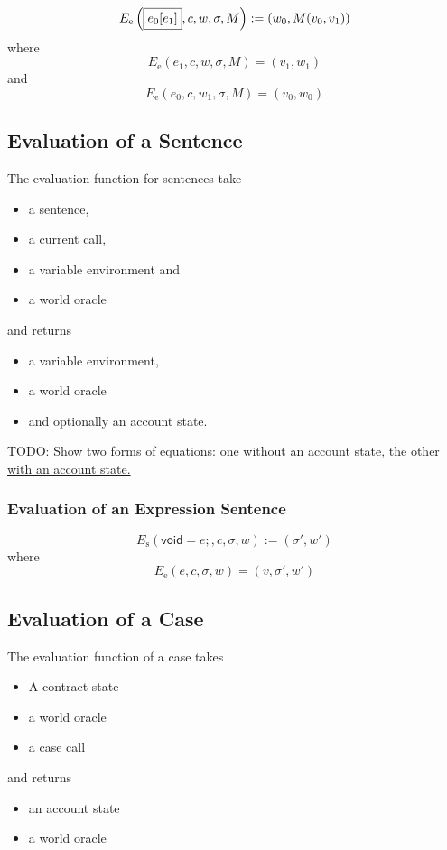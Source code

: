 \documentclass{book}
\newcommand{\todo}[1]{\underline{TODO: {#1}}}
\newcommand{\evalE}[1]{E_\mathrm{e}\left({#1}\right)}
\newcommand{\evalS}[1]{E_\mathrm{s}\left({#1}\right)}
\newcommand{\expressionsentence}[1]{\mathsf{void}={#1}\mathsf{;}}
\begin{document}
\[
\evalE{\boxed{\arrayAccess{e_0}{e_1}}, c, w, \sigma, M} :=
(w_0, M(v_0, v_1))
\]
where
\[
\evalE{\boxed{e_1}, c, w, \sigma, M} = (v_1, w_1)
\]
and
\[
\evalE{\boxed{e_0}, c, w_1, \sigma, M} = (v_0, w_0)
\]

\subsection{Evaluation of a Sentence}

The evaluation function for sentences take
\begin{itemize}
\item a sentence,
\item a current call,
\item a variable environment and
\item a world oracle
\end{itemize}
and returns
\begin{itemize}
\item a variable environment,
\item a world oracle
\item and optionally an account state.
\end{itemize}

\todo{Show two forms of equations: one without an account state, the other with an account state.}

\subsubsection{Evaluation of an Expression Sentence}

\[
\evalS{\boxed{\expressionsentence{e}}, c, \sigma, w} := (\sigma', w')
\]
where
\[
\evalE{\boxed{e}, c, \sigma, w} = (v, \sigma', w')
\]

\subsection{Evaluation of a Case}

The evaluation function of a case takes
\begin{itemize}
\item A contract state
\item a world oracle
\item a case call
\end{itemize}
and returns
\begin{itemize}
\item an account state
\item a world oracle
\end{itemize}
\end{document}
